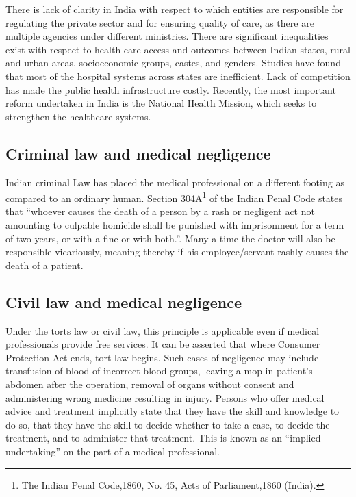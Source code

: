 \begin{multicols}{2}
\noi
There is lack of clarity in India with respect to which entities are responsible for
regulating the private sector and for ensuring quality of care, as there are multiple
agencies under different ministries. There are significant inequalities exist with respect
to health care access and outcomes between Indian states, rural and urban areas,
socioeconomic groups, castes, and genders. Studies have found that most of the hospital
systems across states are inefficient. Lack of competition has made the public health
infrastructure costly. Recently, the most important reform undertaken in India is the
National Health Mission, which seeks to strengthen the healthcare systems.

\subsection*{Criminal law and medical negligence}

\noi
Indian criminal Law has placed the medical professional on a different footing as
compared to an ordinary human. Section 304A\footnote{The Indian Penal Code,1860, No. 45, Acts of Parliament,1860 (India).} of the Indian Penal Code states that “whoever causes the death of a person by a rash or negligent act not amounting to culpable homicide shall be punished with imprisonment for a term of two years, or with a fine or with both.”. Many a time the doctor will also be responsible vicariously, meaning thereby if his employee/servant rashly causes the death of a patient.

\subsection*{Civil law and medical negligence}

\noi
Under the torts law or civil law, this principle is applicable even if medical professionals
provide free services. It can be asserted that where Consumer Protection Act ends, tort
law begins. Such cases of negligence may include transfusion of blood of incorrect
blood groups, leaving a mop in patient’s abdomen after the operation, removal of organs
without consent and administering wrong medicine resulting in injury. Persons who
offer medical advice and treatment implicitly state that they have the skill and
knowledge to do so, that they have the skill to decide whether to take a case, to decide the treatment, and to administer that treatment. This is known as an “implied
undertaking” on the part of a medical professional.


\end{multicols}
